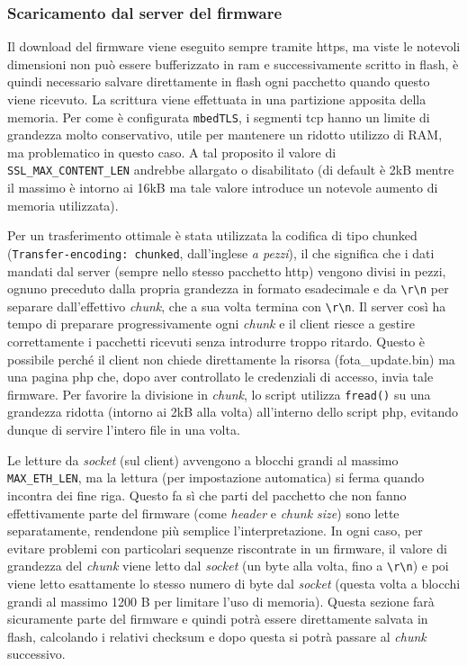 \subsubsection{Scaricamento dal server del firmware}


Il download del firmware viene eseguito sempre tramite https, ma viste le notevoli dimensioni non pu\`o essere bufferizzato in ram e successivamente scritto in flash, \`e quindi necessario salvare direttamente in flash ogni pacchetto quando questo viene ricevuto. La scrittura viene effettuata in una partizione apposita della memoria. Per come \`e configurata \texttt{mbedTLS}, i segmenti tcp hanno un limite di grandezza molto conservativo, utile per mantenere un ridotto utilizzo di RAM, ma problematico in questo caso. A tal proposito il valore di \texttt{SSL\_MAX\_CONTENT\_LEN} andrebbe allargato o disabilitato (di default \`e 2kB mentre il massimo \`e intorno ai 16kB ma tale valore introduce un notevole aumento di memoria utilizzata).

Per un trasferimento ottimale \`e stata utilizzata la codifica di tipo chunked (\texttt{Transfer-encoding: chunked}, dall'inglese \textit{a pezzi}), il che significa che i dati mandati dal server (sempre nello stesso pacchetto http) vengono divisi in pezzi, ognuno preceduto dalla propria grandezza in formato esadecimale e da \texttt{\textbackslash{r}\textbackslash{n}} per separare dall'effettivo \textit{chunk}, che a sua volta termina con \texttt{\textbackslash{r}\textbackslash{n}}. Il server cos\`i ha tempo di preparare progressivamente ogni \textit{chunk} e il client riesce a gestire correttamente i pacchetti ricevuti senza introdurre troppo ritardo. Questo \`e possibile perch\'e il client non chiede direttamente la risorsa (fota\_update.bin) ma una pagina php che, dopo aver controllato le credenziali di accesso, invia tale firmware. Per favorire la divisione in \textit{chunk}, lo script utilizza \texttt{fread()} su una grandezza ridotta (intorno ai 2kB alla volta) all'interno dello script php, evitando dunque di servire l'intero file in una volta.

Le letture da \textit{socket} (sul client) avvengono a blocchi grandi al massimo \texttt{MAX\_ETH\_LEN}, ma la lettura (per impostazione automatica) si ferma quando incontra dei fine riga. Questo fa s\`i che parti del pacchetto che non fanno effettivamente parte del firmware (come \textit{header} e \textit{chunk size}) sono lette separatamente, rendendone pi\`u semplice l'interpretazione. In ogni caso, per evitare problemi con particolari sequenze riscontrate in un firmware, il valore di grandezza del \textit{chunk} viene letto dal \textit{socket} (un byte alla volta, fino a \texttt{\textbackslash{r}\textbackslash{n}}) e poi viene letto esattamente lo stesso numero di byte dal \textit{socket} (questa volta a blocchi grandi al massimo 1200 B per limitare l'uso di memoria). Questa sezione far\`a sicuramente parte del firmware e quindi potr\`a essere direttamente salvata in flash, calcolando i relativi checksum e dopo questa si potr\`a passare al \textit{chunk} successivo.

